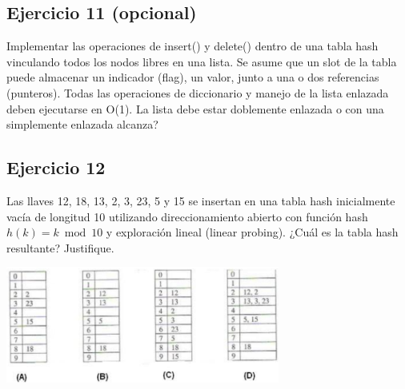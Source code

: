 \documentclass{article}
\begin{document}
\subsection*{Ejercicio 11 (opcional)}
Implementar las operaciones de insert() y delete() dentro de una tabla hash vinculando todos los nodos libres en una lista. Se asume que un slot de la tabla puede almacenar un indicador (flag), un valor, junto a una o dos referencias (punteros). Todas las operaciones de diccionario y manejo de la lista enlazada deben ejecutarse en O(1). La lista debe estar doblemente enlazada o con una simplemente enlazada alcanza?


\subsection*{Ejercicio 12}
Las llaves 12, 18, 13, 2, 3, 23, 5 y 15 se insertan en una tabla hash inicialmente vacía de longitud 10 utilizando direccionamiento abierto con función hash $h(k) = k \bmod 10$ y exploración lineal (linear probing). ¿Cuál es la tabla hash resultante? Justifique.

\begin{center}
    \includegraphics*[width=340px]{./img/ej12.png}
\end{center}
\end{document}
